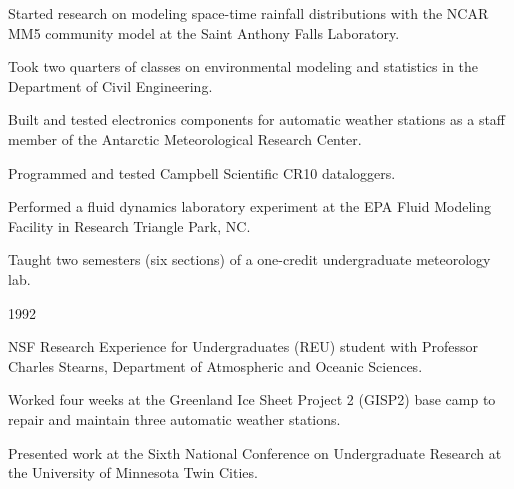 \begin{compactitem}[\itembullet]
  \item Started research on modeling space-time rainfall distributions
    with the NCAR MM5 community model at the Saint Anthony Falls
    Laboratory.
  \item Took two quarters of classes on environmental modeling and
    statistics in the Department of Civil Engineering.
\end{compactitem}

\begin{compactitem}[\itembullet]
  \item Built and tested electronics components for automatic weather
    stations as a staff member of the Antarctic Meteorological
    Research Center.
  \item Programmed and tested Campbell Scientific CR10 dataloggers.
\end{compactitem}

\begin{compactitem}[\itembullet]
  \item Performed a fluid dynamics laboratory experiment at the EPA
    Fluid Modeling Facility in Research Triangle Park, NC.
\end{compactitem}

\begin{compactitem}[\itembullet]
  \item Taught two semesters (six sections) of a one-credit
    undergraduate meteorology lab.
\end{compactitem}

 {1992}
\begin{compactitem}[\itembullet]
  \item NSF Research Experience for Undergraduates (REU) student with
    Professor Charles Stearns, Department of Atmospheric and Oceanic
    Sciences.
  \item Worked four weeks at the Greenland Ice Sheet Project 2 (GISP2)
    base camp to repair and maintain three automatic weather stations.
  \item Presented work at the Sixth National Conference on
    Undergraduate Research at the University of Minnesota Twin Cities.
\end{compactitem}
